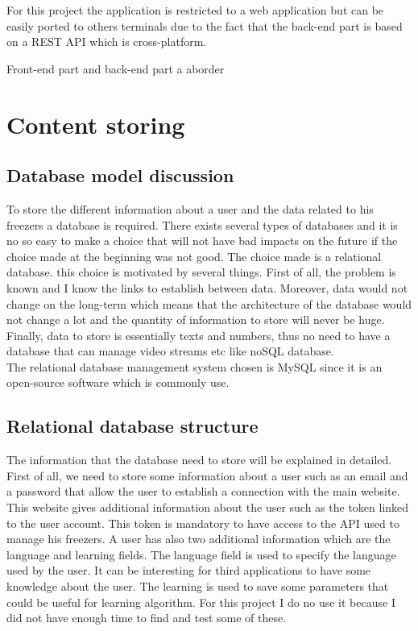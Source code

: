 For this project the application is restricted to a web application but can be easily ported to others terminals due to the fact that the back-end part is based on a REST API which is cross-platform.

Front-end part and back-end part a aborder
\section{Content storing}
\subsection{Database model discussion}
To store the different information about a user and the data related to his freezers a database is required. There exists several types of databases and it is no so easy to make a choice that will not have bad impacts on the future if the choice made at the beginning was not good. The choice made is a relational database. this choice is motivated by several things. First of all, the problem is known and I know the links to establish between data. Moreover, data would not change on the long-term which means that the architecture of the database would not change a lot and the quantity of information to store will never be huge. Finally, data to store is essentially texts and numbers, thus no need to have a database that can manage video streams etc like noSQL database.\\

The relational database management system chosen is MySQL since it is an open-source software which is commonly use.
\subsection{Relational database structure}
The information that the database need to store will be explained in detailed.\\

First of all, we need to store some information about a user such as an email and a password that allow the user to establish a connection with the main website. This website gives additional information about the user such as the token linked to the user account. This token is mandatory to have access to the API used to manage his freezers. A user has also two additional information which are the language and learning fields. The language field is used to specify the language used by the user. It can be interesting for third applications to have some knowledge about the user. The learning is used to save some parameters that could be useful for learning algorithm. For this project I do no use it because I did not have enough time to find and test some of these. \\

